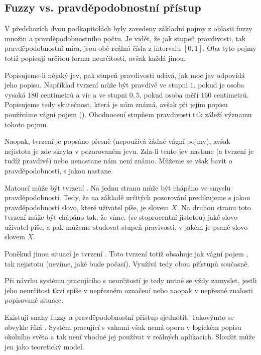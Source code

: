 \subsection{Fuzzy vs. pravděpodobnostní přístup} \label{subsec:FuzzyVsProb}
V předchozích dvou podkapitolách byly zavedeny základní pojmy z oblasti fuzzy množin a pravděpodobnostního počtu. Je vidět, že jak stupeň pravdivosti, tak pravděpodobnostní míra, jsou obě reálná čísla z intervalu $[0, 1]$. Oba tyto pojmy totiž popisují určitou formu neurčitosti, avšak každá jinou. 

Popisujeme-li nějaký jev, pak stupeň pravdivosti udává, jak moc jev odpovídá jeho popisu. Například tvrzení  může být pravdivé ve stupni $1$, pokud je osoba vysoká $180$ centimetrů a víc a ve stupni $0{,}5$, pokud osoba měří $160$ centimetrů. Popisujeme tedy skutečnost, která je nám známá, avšak při jejím popisu používáme vágní pojem (). Ohodnocení stupňem pravdivosti tak záleží významu tohoto pojmu.

Naopak, tvrzení  je popsáno přesně (nepoužívá žádné vágní pojmy), avšak nejistota je zde skryta v pozorovaném jevu. Zda-li tento jev nastane (a tvrzení je tudíž pravdivé) nebo nenastane nám není známo. Můžeme se však bavit o pravděpodobnosti, s jakou nastane.

Matoucí může být tvrzení . Na jednu stranu může být chápáno ve smyslu pravděpodobnosti. Tedy, že na základě určitých pozorování predikujeme s jakou pravděpodobností slovo, které uživatel píše, je slovem $X$. Na druhou stranu toto tvrzení může být chápáno tak, že víme, (se stoprocentní jistotou) jaké slovo uživatel píše, a pak můžeme studovat stupeň pravivosti, v jakém je psané slovo slovem $X$.

Poněkud jinou situací je tvrzení . Toto tvrzení totiž obsahuje jak vágní pojem , tak nejistotu (nevíme, jaké bude počasí). Využívá tedy obou přístupů současně.

Při návrhu systému pracujícího s neurčitostí je tedy nutné se vždy zamyslet, jestli jeho neurčitost tkví spíše v nepřesném označení nebo naopak v nepřesné znalosti popisované situace.

\begin{note}
 Existují snahy fuzzy a pravděpodobnostní přístup sjednotit. Takovýmto  se obvykle říká . Systém pracující s vahami však nemá oporu v logickém popisu okolního světa a tak není vhodné jej používat v reálných aplikacích. Sloužit může jen jako teoretický model.
\end{note}


